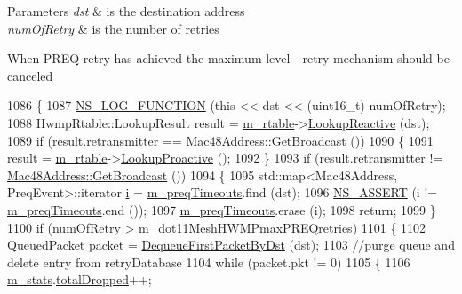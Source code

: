 \begin{DoxyParams}{Parameters}
{\em dst} & is the destination address \\
\hline
{\em num\+Of\+Retry} & is the number of retries\\
\hline
\end{DoxyParams}
When P\+R\+EQ retry has achieved the maximum level -\/ retry mechanism should be canceled 
\begin{DoxyCode}
1086 \{
1087   \hyperlink{log-macros-disabled_8h_a90b90d5bad1f39cb1b64923ea94c0761}{NS\_LOG\_FUNCTION} (\textcolor{keyword}{this} << dst << (uint16\_t) numOfRetry);
1088   HwmpRtable::LookupResult result = \hyperlink{classns3_1_1dot11s_1_1HwmpProtocol_a12fda0e3e5a400888c8ba1a87c1a7216}{m\_rtable}->\hyperlink{classns3_1_1dot11s_1_1HwmpRtable_a41a44ed94c1ed4d798f3278ba8db0f1f}{LookupReactive} (dst);
1089   \textcolor{keywordflow}{if} (result.retransmitter == \hyperlink{classns3_1_1Mac48Address_a55156e302c6bf950c0b558365adbde84}{Mac48Address::GetBroadcast} ())
1090     \{
1091       result = \hyperlink{classns3_1_1dot11s_1_1HwmpProtocol_a12fda0e3e5a400888c8ba1a87c1a7216}{m\_rtable}->\hyperlink{classns3_1_1dot11s_1_1HwmpRtable_ad4bed27ab37ab1bc606802b763225a23}{LookupProactive} ();
1092     \}
1093   \textcolor{keywordflow}{if} (result.retransmitter != \hyperlink{classns3_1_1Mac48Address_a55156e302c6bf950c0b558365adbde84}{Mac48Address::GetBroadcast} ())
1094     \{
1095       std::map<Mac48Address, PreqEvent>::iterator \hyperlink{bernuolliDistribution_8m_a6f6ccfcf58b31cb6412107d9d5281426}{i} = \hyperlink{classns3_1_1dot11s_1_1HwmpProtocol_a8965b53a5ae63807e2bcf0faaa4a6dc2}{m\_preqTimeouts}.find (dst);
1096       \hyperlink{assert_8h_a6dccdb0de9b252f60088ce281c49d052}{NS\_ASSERT} (i != \hyperlink{classns3_1_1dot11s_1_1HwmpProtocol_a8965b53a5ae63807e2bcf0faaa4a6dc2}{m\_preqTimeouts}.end ());
1097       \hyperlink{classns3_1_1dot11s_1_1HwmpProtocol_a8965b53a5ae63807e2bcf0faaa4a6dc2}{m\_preqTimeouts}.erase (i);
1098       \textcolor{keywordflow}{return};
1099     \}
1100   \textcolor{keywordflow}{if} (numOfRetry > \hyperlink{classns3_1_1dot11s_1_1HwmpProtocol_afb618f3a22ef3fff0e664fac76040933}{m\_dot11MeshHWMPmaxPREQretries})
1101     \{
1102       QueuedPacket packet = \hyperlink{classns3_1_1dot11s_1_1HwmpProtocol_a90618325ad9eb49c63093da0a9b313d9}{DequeueFirstPacketByDst} (dst);
1103       \textcolor{comment}{//purge queue and delete entry from retryDatabase}
1104       \textcolor{keywordflow}{while} (packet.pkt != 0)
1105         \{
1106           \hyperlink{classns3_1_1dot11s_1_1HwmpProtocol_a478a13e7ec9ca167a5b13b38237d17ae}{m\_stats}.\hyperlink{structns3_1_1dot11s_1_1HwmpProtocol_1_1Statistics_a10f7af4034c326fc11df2942321e36f2}{totalDropped}++;

\end{DoxyCode}
